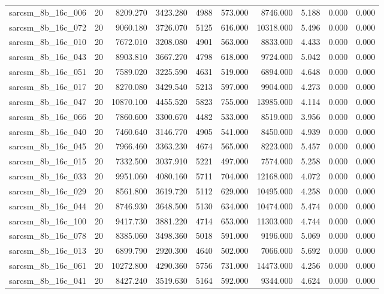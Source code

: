 \begin{tabular}{lrrrrrrrrr}
sarcsm\_8b\_16c\_006 & 20 & 8209.270 & 3423.280 & 4988 & 573.000 & 8746.000 & 5.188 & 0.000 & 0.000 \\
sarcsm\_8b\_16c\_072 & 20 & 9060.180 & 3726.070 & 5125 & 616.000 & 10318.000 & 5.496 & 0.000 & 0.000 \\
sarcsm\_8b\_16c\_010 & 20 & 7672.010 & 3208.080 & 4901 & 563.000 & 8833.000 & 4.433 & 0.000 & 0.000 \\
sarcsm\_8b\_16c\_043 & 20 & 8903.810 & 3667.270 & 4798 & 618.000 & 9724.000 & 5.042 & 0.000 & 0.000 \\
sarcsm\_8b\_16c\_051 & 20 & 7589.020 & 3225.590 & 4631 & 519.000 & 6894.000 & 4.648 & 0.000 & 0.000 \\
sarcsm\_8b\_16c\_017 & 20 & 8270.080 & 3429.540 & 5213 & 597.000 & 9904.000 & 4.273 & 0.000 & 0.000 \\
sarcsm\_8b\_16c\_047 & 20 & 10870.100 & 4455.520 & 5823 & 755.000 & 13985.000 & 4.114 & 0.000 & 0.000 \\
sarcsm\_8b\_16c\_066 & 20 & 7860.600 & 3300.670 & 4482 & 533.000 & 8519.000 & 3.956 & 0.000 & 0.000 \\
sarcsm\_8b\_16c\_040 & 20 & 7460.640 & 3146.770 & 4905 & 541.000 & 8450.000 & 4.939 & 0.000 & 0.000 \\
sarcsm\_8b\_16c\_045 & 20 & 7966.460 & 3363.230 & 4674 & 565.000 & 8223.000 & 5.457 & 0.000 & 0.000 \\
sarcsm\_8b\_16c\_015 & 20 & 7332.500 & 3037.910 & 5221 & 497.000 & 7574.000 & 5.258 & 0.000 & 0.000 \\
sarcsm\_8b\_16c\_033 & 20 & 9951.060 & 4080.160 & 5711 & 704.000 & 12168.000 & 4.072 & 0.000 & 0.000 \\
sarcsm\_8b\_16c\_029 & 20 & 8561.800 & 3619.720 & 5112 & 629.000 & 10495.000 & 4.258 & 0.000 & 0.000 \\
sarcsm\_8b\_16c\_044 & 20 & 8746.930 & 3648.500 & 5130 & 634.000 & 10474.000 & 5.474 & 0.000 & 0.000 \\
sarcsm\_8b\_16c\_100 & 20 & 9417.730 & 3881.220 & 4714 & 653.000 & 11303.000 & 4.744 & 0.000 & 0.000 \\
sarcsm\_8b\_16c\_078 & 20 & 8385.060 & 3498.360 & 5018 & 591.000 & 9196.000 & 5.069 & 0.000 & 0.000 \\
sarcsm\_8b\_16c\_013 & 20 & 6899.790 & 2920.300 & 4640 & 502.000 & 7066.000 & 5.692 & 0.000 & 0.000 \\
sarcsm\_8b\_16c\_061 & 20 & 10272.800 & 4290.360 & 5756 & 731.000 & 14473.000 & 4.256 & 0.000 & 0.000 \\
sarcsm\_8b\_16c\_041 & 20 & 8427.240 & 3519.630 & 5164 & 592.000 & 9344.000 & 4.624 & 0.000 & 0.000 \\

\end{tabular}
